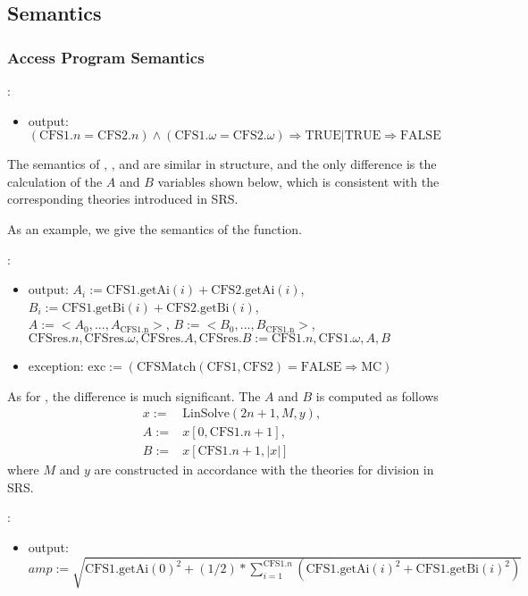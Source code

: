 \documentclass[12pt, titlepage]{article}
\begin{document}
\subsection{Semantics}
\subsubsection{Access Program Semantics}
\noindent {}:
\begin{itemize} 
	\item output: $(\text{CFS1}.n=\text{CFS2}.n)\wedge(\text{CFS1}.\omega=\text{CFS2}.\omega)\Rightarrow\text{TRUE}|\text{TRUE}\Rightarrow\text{FALSE}$ 
\end{itemize}

The semantics of , , and  are similar in structure, and the only difference is the calculation of the $A$ and $B$ variables shown below, which is consistent with the corresponding theories introduced in SRS.

As an example, we give the semantics of the  function.

\noindent {}:
\begin{itemize}
	\item output: $A_i:=\text{CFS1}.\text{getAi}(i)+\text{CFS2}.\text{getAi}(i)$,
	$B_i:=\text{CFS1}.\text{getBi}(i)+\text{CFS2}.\text{getBi}(i)$,\\
	$A:=<A_0, ..., A_{\text{CFS1.n}}>$, $B:=<B_0, ..., B_{\text{CFS1.n}}>$,\\
	$\text{CFSres}.n, \text{CFSres}.\omega, \text{CFSres}.A, \text{CFSres}.B:=\text{CFS1}.n, \text{CFS1}.\omega, A, B$
	\item exception: $\text{exc}:=(\text{CFSMatch}(\text{CFS1}, \text{CFS2})=\text{FALSE}\Rightarrow\text{MC})$
\end{itemize}

As for , the difference is much significant. The $A$ and $B$ is computed as follows
\begin{align*}
	x:=&\text{LinSolve}(2n+1, M, y),\\
	A:=&x[0,\text{CFS1}.n+1],\\
	B:=&x[\text{CFS1}.n+1, |x|]
\end{align*}
where $M$ and $y$ are constructed in accordance with the theories for division in SRS.

\noindent {}:
\begin{itemize} 
	\item output: $amp:=\sqrt{\text{CFS1}.\text{getAi}(0)^2+(1/2)*\sum_{i=1}^{\text{CFS1}.n}(\text{CFS1}.\text{getAi}(i)^2+\text{CFS1}.\text{getBi}(i)^2)}$ 
\end{itemize}
\end{document}
